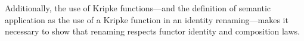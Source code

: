 \documentclass[authoryear, acmsmall, screen, review, nonacm]{acmart}
\begin{document}
Additionally, the use of Kripke functions---and the definition of semantic application as the use of a Kripke function in an identity renaming---makes it necessary to show that renaming respects functor identity and composition laws.

\begin{code}%
\>[0]\AgdaSpace{}%
\AgdaSymbol{:}\AgdaSpace{}%
\AgdaSpace{}%
\AgdaSymbol{(}\AgdaSpace{}%
\AgdaSymbol{:}\AgdaSpace{}%
\AgdaSpace{}%
\AgdaSpace{}%
\AgdaSymbol{)}\AgdaSpace{}%
\AgdaSpace{}%
\AgdaSpace{}%
\AgdaSpace{}%
\AgdaSpace{}%
\AgdaSpace{}%
\<%
\\
\>[0]%
\>[3856I]\AgdaSymbol{:}\AgdaSpace{}%
\AgdaSpace{}%
\AgdaSymbol{(}\AgdaSpace{}%
\AgdaSymbol{:}\AgdaSpace{}%
\AgdaSpace{}%
\AgdaSpace{}%
\AgdaSymbol{)}\AgdaSpace{}%
\AgdaSymbol{(}\AgdaSpace{}%
\AgdaSymbol{:}\AgdaSpace{}%
\AgdaSpace{}%
\AgdaSpace{}%
\AgdaSymbol{)}\AgdaSpace{}%
\<%
\\
\>[3856I][@{}l@{\AgdaIndent{0}}]%
\>[11]\AgdaSpace{}%
\AgdaSymbol{(}\AgdaSpace{}%
\AgdaSymbol{:}\AgdaSpace{}%
\AgdaSpace{}%
\AgdaSpace{}%
\AgdaSymbol{)}\AgdaSpace{}%
\AgdaSpace{}%
\AgdaSpace{}%
\AgdaSymbol{(}\AgdaSpace{}%
\AgdaSpace{}%
\AgdaSymbol{)}\AgdaSpace{}%
\AgdaSpace{}%
\AgdaSpace{}%
\AgdaSpace{}%
\AgdaSpace{}%
\AgdaSymbol{(}\AgdaSpace{}%
\AgdaSpace{}%
\AgdaSymbol{)}\<%
\end{code}
\end{document}
